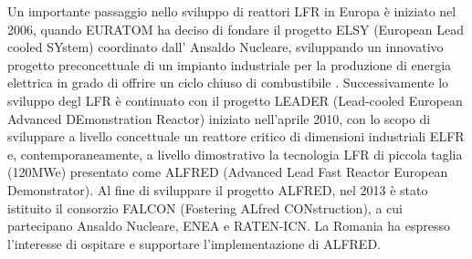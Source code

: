 Un importante passaggio nello sviluppo di reattori LFR in Europa è iniziato nel 
2006, quando EURATOM ha deciso di fondare il progetto ELSY (European Lead 
cooled 
SYstem) coordinato dall' Ansaldo Nucleare, sviluppando un innovativo progetto 
preconcettuale di un impianto industriale per la produzione di energia elettrica 
in grado di offrire un ciclo chiuso di combustibile \cite{cinotti2008elsy}.
Successivamente lo sviluppo degl LFR è continuato con il progetto LEADER 
(Lead-cooled European Advanced DEmonstration Reactor) iniziato nell'aprile 
2010, 
con lo scopo di sviluppare a livello concettuale un reattore critico di 
dimensioni industriali ELFR e, contemporaneamente, a livello dimostrativo la 
tecnologia LFR di piccola taglia (120MWe) presentato come ALFRED (Advanced 
Lead 
Fast Reactor European Demonstrator).
Al fine di sviluppare il progetto ALFRED, nel 2013 è stato istituito il 
consorzio FALCON (Fostering ALfred CONstruction), a cui partecipano Ansaldo 
Nucleare, ENEA e RATEN-ICN. La Romania ha espresso l'interesse di ospitare e 
supportare l'implementazione di ALFRED.
